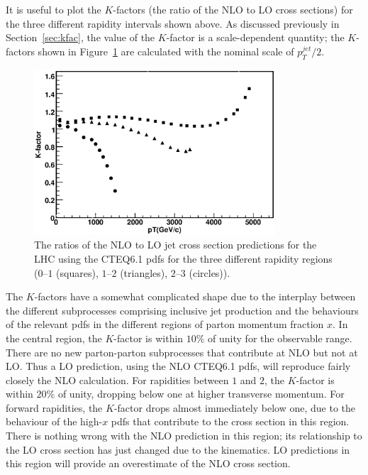 \documentclass[12pt]{iopart}
\begin{document}
It is useful to plot the $K$-factors (the ratio of the NLO to LO cross sections) for  the three  different
rapidity intervals shown above. As discussed previously in Section~\ref{sec:kfac}, the value of the $K$-factor is a scale-dependent
quantity; the $K$-factors shown in Figure~\ref{fig:Kfactors} are calculated with the nominal scale of $p_T^{jet}/2$.
%
\begin{figure}[t]
\begin{center}
\includegraphics[width=9cm]{Kfactors.eps}
\end{center}
\vspace*{-0.5cm}
\caption{
The ratios of the NLO to LO jet cross section predictions for the LHC using the 
CTEQ6.1 pdfs for the three different rapidity regions ($0$--$1$ (squares), $1$--$2$ (triangles),
$2$--$3$ (circles)). 
\label{fig:Kfactors}
}
\end{figure}
%
The $K$-factors have a somewhat complicated shape due to the interplay between the different subprocesses comprising
inclusive jet production and the behaviours of the relevant pdfs in the different regions of parton momentum
fraction $x$. In the central region, the $K$-factor is within $10\%$ of unity for the observable range. There are
no new parton-parton subprocesses that contribute at NLO but not at LO. Thus a LO prediction, using the NLO
CTEQ6.1 pdfs, will reproduce fairly closely the NLO calculation. For rapidities between $1$ and $2$, the
$K$-factor is within $20\%$ of unity, dropping below one at higher transverse momentum. For forward rapidities,
the $K$-factor drops almost immediately below one, due to the behaviour of the high-$x$ pdfs that contribute  to
the cross  section in this region. There is nothing wrong with the NLO prediction in this region; its
relationship to the LO cross section has just changed due to the kinematics. LO predictions in this region will
provide an overestimate of the NLO cross section.  
\end{document}
